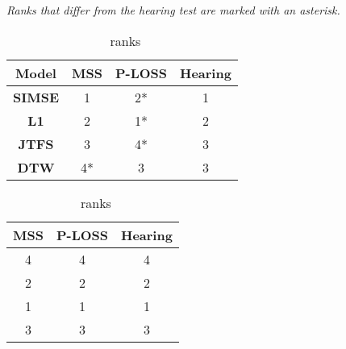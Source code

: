 \noindent\textit{Ranks that differ from the hearing test are marked with an asterisk.}

\begin{table}[htbp]
\centering
\begin{minipage}{0.45\textwidth}
    \centering
    \begin{tabular}{|c|c|c|c|}
    \hline
    \textbf{Model} & \textbf{MSS} & \textbf{P-LOSS} & \textbf{Hearing} \\
    \hline
    \textbf{SIMSE} & 1\phantom{*} & 2* & 1\phantom{*} \\
    \textbf{L1}    & 2\phantom{*} & 1* & 2\phantom{*} \\
    \textbf{JTFS}  & 3\phantom{*} & 4* & 3\phantom{*} \\
    \textbf{DTW}   & 4*           & 3\phantom{*} & 3\phantom{*} \\
    \hline
    \end{tabular}
    \caption{\footnotesize \BPNoise~ranks}
    \label{tab:p0}
\end{minipage}%
\hspace{1cm}
\begin{minipage}{0.45\textwidth}
    \centering
    \begin{tabular}{|c|c|c|}
    \hline
    \textbf{MSS} & \textbf{P-LOSS} & \textbf{Hearing} \\
    \hline
    4\phantom{*} & 4\phantom{*} & 4\phantom{*} \\
    2\phantom{*} & 2\phantom{*} & 2\phantom{*} \\
    1\phantom{*} & 1\phantom{*} & 1\phantom{*} \\
    3\phantom{*} & 3\phantom{*} & 3\phantom{*} \\
    \hline
    \end{tabular}
    \caption{\footnotesize \AddSineSaw~ranks}
    \label{tab:p1}
\end{minipage}

\vspace{0.5cm} %


\end{table}
